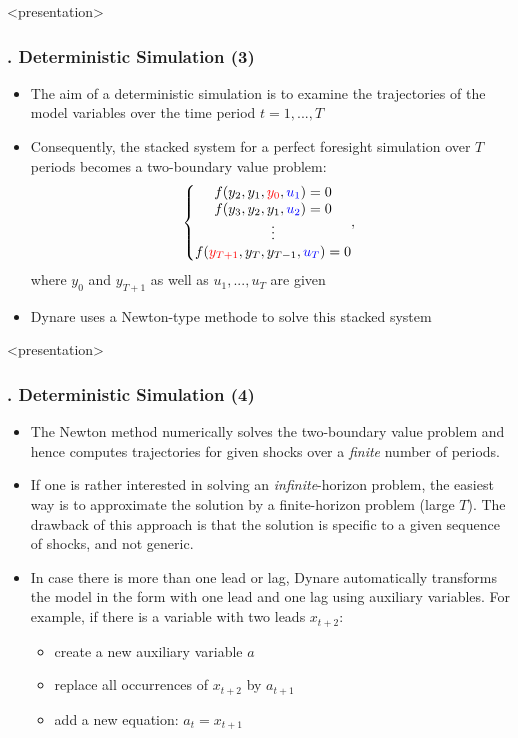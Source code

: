 \documentclass[11pt,aspectratio=169]{beamer}
\begin{document}
\begin{frame}<presentation>
	\frametitle{{\thesection.\thesubsection\thinspace\thesubsubsection} Deterministic Simulation (3)}
	\begin{itemize}
		\item The aim of a deterministic simulation is to examine the trajectories of the model variables over the time period $t = 1,...,T$
		\item Consequently, the stacked system for a perfect foresight simulation over $T$ periods becomes a two-boundary value problem: 
		$$\left\{ \begin{matrix} f(y_2,y_1,\mathbin{\textcolor{red}{y_0}},\mathbin{\textcolor{blue}{u_1}})=0 \\ 
		f(y_3,y_2,y_1,\mathbin{\textcolor{blue}{u_2}})=0 \\ 
		\vdots \\ 
		f(\mathbin{\textcolor{red}{y_{T+1}}},y_T,y_{T-1},\mathbin{\textcolor{blue}{u_T}})=0 
		\end{matrix},  \right.$$ 
		where $y_0$ and $y_{T+1}$ as well as $u_1,...,u_T$ are given
		\item Dynare uses a Newton-type methode to solve this stacked system
	\end{itemize}
\end{frame}
\begin{frame}<presentation>
	\frametitle{{\thesection.\thesubsection\thinspace\thesubsubsection} Deterministic Simulation (4)}
	\begin{itemize}
		\item The Newton method numerically solves the two-boundary value problem and hence computes trajectories for given shocks over a \textit{finite} number of periods. 
		\item If one is rather interested in solving an \textit{infinite}-horizon problem, the easiest way is to approximate the solution by a finite-horizon problem (large $T$). The drawback of this approach is that the solution is specific to a given sequence of shocks, and not generic.  
		\item In case there is more than one lead or lag, Dynare automatically transforms the model in the form with one lead and one lag using auxiliary variables. For example, if there is a variable with two leads $x_{t+2}$:
		\begin{itemize}
			\item create a new auxiliary variable $a$
			\item replace all occurrences of $x_{t+2}$ by $a_{t+1}$
			\item add a new equation: $a_t = x_{t+1}$		
		\end{itemize}
	\end{itemize}
\end{frame}
\end{document}
